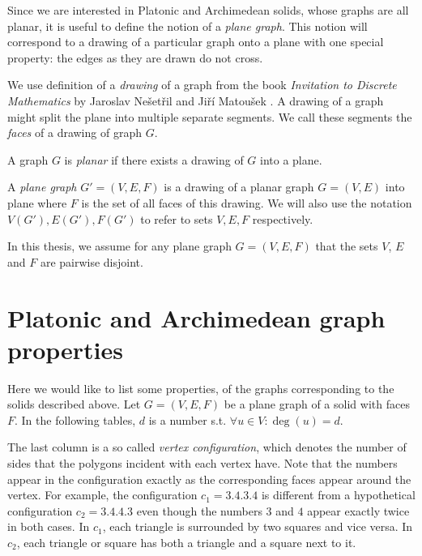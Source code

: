 Since we are interested in Platonic and Archimedean solids, whose graphs are all planar, it is useful to define the notion of a \textit{plane graph}. This notion will correspond to a drawing of a particular graph onto a plane with one special property: the edges as they are drawn do not cross. 

We use definition of a \textit{drawing} of a graph from the book \textit{Invitation to Discrete Mathematics} by Jaroslav Nešetřil and Jiří Matoušek \cite{matousek2009}. A drawing of a graph might split the plane into multiple separate segments. We call these segments the \textit{faces} of a drawing of graph $G$.

\begin{defn}
    A graph $G$ is \emph{planar} if there exists a drawing of $G$ into a plane.
\end{defn}

\begin{defn}
    A \emph{plane graph} $G' = (V,E,F)$ is a drawing of a planar graph $G=(V,E)$ into plane where $F$ is the set of all faces of this drawing. We will also use the notation $V(G'), E(G'), F(G')$ to refer to sets $V,E,F$ respectively.
\end{defn}

In this thesis, we assume for any plane graph $G=(V,E,F)$ that the sets $V$, $E$ and $F$ are pairwise disjoint.

\section{Platonic and Archimedean graph properties}

Here we would like to list some properties, of the graphs corresponding to the solids described above. Let $G=(V,E,F)$ be a plane graph of a solid with faces $F$. In the following tables, $d$ is a number s.t. $\forall u \in V : \deg(u) = d$. 

The last column is a so called \textit{vertex configuration}, which denotes the number of sides that the polygons incident with each vertex have. Note that the numbers appear in the configuration exactly as the corresponding faces appear around the vertex. For example, the configuration $c_1 = 3.4.3.4$ is different from a hypothetical configuration $c_2 = 3.4.4.3$ even though the numbers $3$ and $4$ appear exactly twice in both cases. In $c_1$, each triangle is surrounded by two squares and vice versa. In $c_2$, each triangle or square has both a triangle and a square next to it. 

